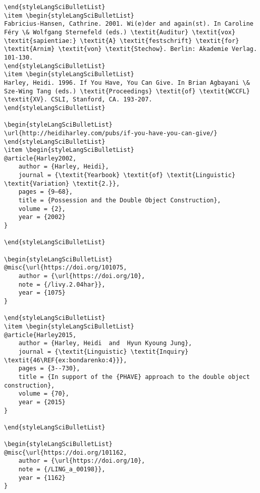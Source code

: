 \documentclass[output=paper,modfonts,nonflat,
 hidelinks
]{langsci/langscibook}
\begin{document}
\begin{verbatim}
\end{styleLangSciBulletList}
\item \begin{styleLangSciBulletList}
Fabricius-Hansen, Cathrine. 2001. Wi(e)der and again(st). In Caroline Féry \& Wolfgang Sternefeld (eds.) \textit{Auditur} \textit{vox} \textit{sapientiae:} \textit{A} \textit{festschrift} \textit{for} \textit{Arnim} \textit{von} \textit{Stechow}. Berlin: Akademie Verlag. 101-130.
\end{styleLangSciBulletList}
\item \begin{styleLangSciBulletList}
Harley, Heidi. 1996. If You Have, You Can Give. In Brian Agbayani \& Sze-Wing Tang (eds.) \textit{Proceedings} \textit{of} \textit{WCCFL} \textit{XV}. CSLI, Stanford, CA. 193-207.
\end{styleLangSciBulletList}

\begin{styleLangSciBulletList}
\url{http://heidiharley.com/pubs/if-you-have-you-can-give/}
\end{styleLangSciBulletList}
\item \begin{styleLangSciBulletList}
@article{Harley2002,
	author = {Harley, Heidi},
	journal = {\textit{Yearbook} \textit{of} \textit{Linguistic} \textit{Variation} \textit{2.}},
	pages = {9–68},
	title = {Possession and the Double Object Construction},
	volume = {2},
	year = {2002}
}

\end{styleLangSciBulletList}

\begin{styleLangSciBulletList}
@misc{\url{https://doi.org/101075,
	author = {\url{https://doi.org/10},
	note = {/livy.2.04har}},
	year = {1075}
}

\end{styleLangSciBulletList}
\item \begin{styleLangSciBulletList}
@article{Harley2015,
	author = {Harley, Heidi  and  Hyun Kyoung Jung},
	journal = {\textit{Linguistic} \textit{Inquiry} \textit{46\REF{ex:bondarenko:4}}},
	pages = {3--730},
	title = {In support of the {PHAVE} approach to the double object construction},
	volume = {70},
	year = {2015}
}

\end{styleLangSciBulletList}

\begin{styleLangSciBulletList}
@misc{\url{https://doi.org/101162,
	author = {\url{https://doi.org/10},
	note = {/LING_a_00198}},
	year = {1162}
}


\end{verbatim}
\end{document}
